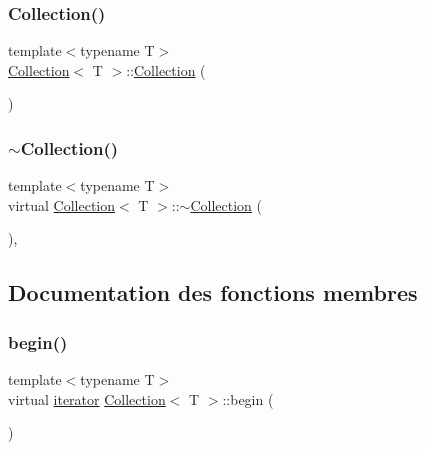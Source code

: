 \subsubsection{\texorpdfstring{Collection()}{Collection()}}
{\footnotesize\ttfamily template$<$typename T$>$ \\
\hyperlink{class_collection}{Collection}$<$ T $>$\+::\hyperlink{class_collection}{Collection} (\begin{DoxyParamCaption}{ }\end{DoxyParamCaption})\hspace{0.3cm}{\ttfamily [default]}}

\mbox{\label{class_collection_ae9e3ec131717723e10152cb7ec3b0379}} 
\subsubsection{\texorpdfstring{$\sim$\+Collection()}{~Collection()}}
{\footnotesize\ttfamily template$<$typename T$>$ \\
virtual \hyperlink{class_collection}{Collection}$<$ T $>$\+::$\sim$\hyperlink{class_collection}{Collection} (\begin{DoxyParamCaption}{ }\end{DoxyParamCaption})\hspace{0.3cm}{\ttfamily [virtual]}, {\ttfamily [default]}}



\subsection{Documentation des fonctions membres}
\mbox{\label{class_collection_a4abc73f8e31a499a22b25d42b7a4fe8c}} 
\subsubsection{\texorpdfstring{begin()}{begin()}}
{\footnotesize\ttfamily template$<$typename T$>$ \\
virtual \hyperlink{class_collection_a317dca4fdf1eb2e47643bb60c620f802}{iterator} \hyperlink{class_collection}{Collection}$<$ T $>$\+::begin (\begin{DoxyParamCaption}{ }\end{DoxyParamCaption})\hspace{0.3cm}{\ttfamily [pure virtual]}}



